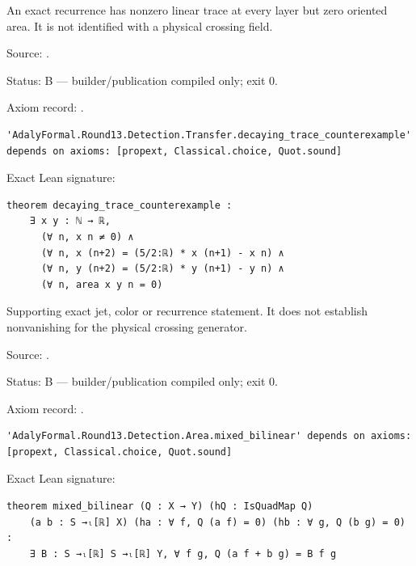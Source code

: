 \begin{theorem}[bp-512]
\label{bp-512}
\uses{}
\leanok
An exact recurrence has nonzero linear trace at every layer but zero oriented area. It is not identified with a physical crossing field.

\par Source: \texttt{}.
\par Status: B — builder/publication compiled only; exit 0.
\par Axiom record: \texttt{}.
\begin{verbatim}
'AdalyFormal.Round13.Detection.Transfer.decaying_trace_counterexample' depends on axioms: [propext, Classical.choice, Quot.sound]
\end{verbatim}
\par Exact Lean signature:
\begin{verbatim}
theorem decaying_trace_counterexample :
    ∃ x y : ℕ → ℝ,
      (∀ n, x n ≠ 0) ∧
      (∀ n, x (n+2) = (5/2:ℝ) * x (n+1) - x n) ∧
      (∀ n, y (n+2) = (5/2:ℝ) * y (n+1) - y n) ∧
      (∀ n, area x y n = 0)
\end{verbatim}
\end{theorem}

\begin{theorem}[bp-513]
\label{bp-513}
\uses{}
\leanok
Supporting exact jet, color or recurrence statement. It does not establish nonvanishing for the physical crossing generator.

\par Source: \texttt{}.
\par Status: B — builder/publication compiled only; exit 0.
\par Axiom record: \texttt{}.
\begin{verbatim}
'AdalyFormal.Round13.Detection.Area.mixed_bilinear' depends on axioms: [propext, Classical.choice, Quot.sound]
\end{verbatim}
\par Exact Lean signature:
\begin{verbatim}
theorem mixed_bilinear (Q : X → Y) (hQ : IsQuadMap Q)
    (a b : S →ₗ[ℝ] X) (ha : ∀ f, Q (a f) = 0) (hb : ∀ g, Q (b g) = 0) :
    ∃ B : S →ₗ[ℝ] S →ₗ[ℝ] Y, ∀ f g, Q (a f + b g) = B f g
\end{verbatim}
\end{theorem}

